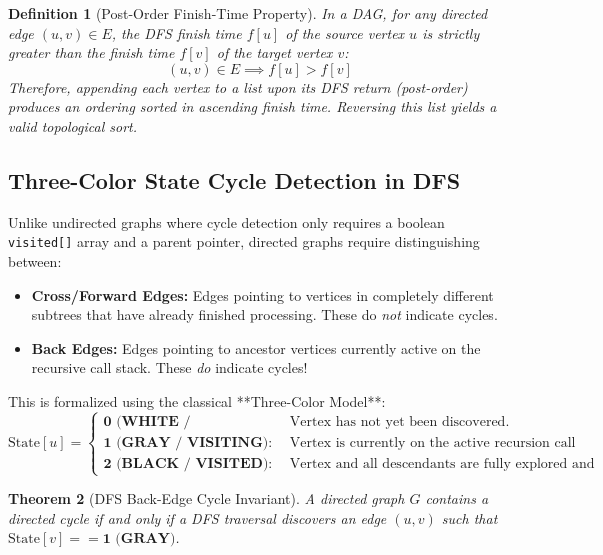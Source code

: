 \documentclass[10pt,journal,compsoc,onecolumn]{IEEEtran}
\newtheorem{theorem}{Theorem}
\newtheorem{definition}[theorem]{Definition}
\begin{document}
\begin{definition}[Post-Order Finish-Time Property]
In a DAG, for any directed edge $(u, v) \in E$, the DFS finish time $f[u]$ of the source vertex $u$ is strictly greater than the finish time $f[v]$ of the target vertex $v$:
\begin{equation}
(u, v) \in E \implies f[u] > f[v]
\end{equation}
Therefore, appending each vertex to a list upon its DFS return (post-order) produces an ordering sorted in ascending finish time. Reversing this list yields a valid topological sort.
\end{definition}

\subsection{Three-Color State Cycle Detection in DFS}
Unlike undirected graphs where cycle detection only requires a boolean \texttt{visited[]} array and a parent pointer, directed graphs require distinguishing between:
\begin{itemize}
    \item \textbf{Cross/Forward Edges:} Edges pointing to vertices in completely different subtrees that have already finished processing. These do \emph{not} indicate cycles.
    \item \textbf{Back Edges:} Edges pointing to ancestor vertices currently active on the recursive call stack. These \emph{do} indicate cycles!
\end{itemize}

This is formalized using the classical **Three-Color Model**:
\begin{equation}
\text{State}[u] = \begin{cases}
\textbf{0 (WHITE / UNVISITED):} & \text{Vertex has not yet been discovered.} \\
\textbf{1 (GRAY / VISITING):} & \text{Vertex is currently on the active recursion call stack.} \\
\textbf{2 (BLACK / VISITED):} & \text{Vertex and all descendants are fully explored and finalized.}
\end{cases}
\end{equation}

\begin{theorem}[DFS Back-Edge Cycle Invariant]
A directed graph $G$ contains a directed cycle if and only if a DFS traversal discovers an edge $(u, v)$ such that $\text{State}[v] == \textbf{1 (GRAY)}$.
\end{theorem}
\end{document}
